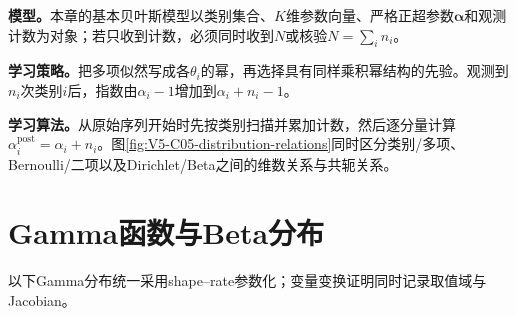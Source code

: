\documentclass[UTF8,a4paper,11pt,openany]{ctexbook}
\begin{document}
\setcounter{page}{826}
\setcounter{chapter}{34}
\setcounter{figure}{2}
\setcounter{equation}{2}
\pagestyle{headings}
\textbf{模型。}本章的基本贝叶斯模型以类别集合、$K$维参数向量、严格正超参数$\boldsymbol\alpha$和观测计数为对象；若只收到计数，必须同时收到$N$或核验$N=\sum_i n_i$。

\textbf{学习策略。}把多项似然写成各$\theta_i$的幂，再选择具有同样乘积幂结构的先验。观测到$n_i$次类别$i$后，指数由$\alpha_i-1$增加到$\alpha_i+n_i-1$。

\textbf{学习算法。}从原始序列开始时先按类别扫描并累加计数，然后逐分量计算$\alpha_i^{\mathrm{post}}=\alpha_i+n_i$。图\ref{fig:V5-C05-distribution-relations}同时区分类别/多项、Bernoulli/二项以及Dirichlet/Beta之间的维数关系与共轭关系。

\FloatBarrier
\section*{Gamma函数与Beta分布}
以下Gamma分布统一采用shape--rate参数化；变量变换证明同时记录取值域与Jacobian。
\end{document}
